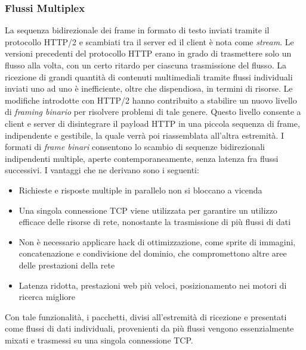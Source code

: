 \documentclass[a4paper,11pt]{article}
\begin{document}
\subsubsection{Flussi Multiplex}
La sequenza bidirezionale dei frame in formato di testo inviati tramite il protocollo HTTP/2 e scambiati tra il server ed il client è nota come \textit{stream}.\newline
Le versioni precedenti del protocollo HTTP erano in grado di trasmettere solo un flusso alla volta, con un certo ritardo per ciascuna trasmissione del flusso. La ricezione di grandi quantità di contenuti multimediali tramite flussi individuali inviati uno ad uno è inefficiente, oltre che dispendiosa, in termini di risorse. Le modifiche introdotte con HTTP/2 hanno contribuito a stabilire un nuovo livello di \textit{framing binario} per risolvere problemi di tale genere.\newline
Questo livello consente a client e server di disintegrare il payload HTTP in una piccola sequenza di frame, indipendente e gestibile, la quale verrà poi riassemblata all’altra estremità.\newline
I formati di \textit{frame binari} consentono lo scambio di sequenze bidirezionali indipendenti multiple, aperte contemporaneamente, senza latenza fra flussi successivi.\newline
I vantaggi che ne derivano sono i seguenti:
\begin{itemize}
    \item Richieste e risposte multiple in parallelo non si bloccano a vicenda
    \item Una singola connessione TCP viene utilizzata per garantire un utilizzo efficace delle risorse di rete, nonostante la trasmissione di più flussi di dati
    \item Non è necessario applicare hack di ottimizzazione, come sprite di immagini, concatenazione e condivisione del dominio, che compromettono altre aree delle prestazioni della rete
    \item Latenza ridotta, prestazioni web più veloci, posizionamento nei motori di ricerca migliore
\end{itemize}\bigbreak
\noindent Con tale funzionalità, i pacchetti, divisi all'estremità di ricezione e presentati come flussi di dati individuali, provenienti da più flussi vengono essenzialmente mixati e trasmessi su una singola connessione TCP.
\end{document}
